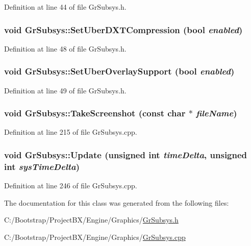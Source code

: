 Definition at line 44 of file GrSubsys.h.\hypertarget{class_gr_subsys_4def4c86d374f56b9d193fa851bcf8b5}{
\subsubsection[{SetUberDXTCompression}]{\setlength{\rightskip}{0pt plus 5cm}void GrSubsys::SetUberDXTCompression (bool {\em enabled})}}
\label{class_gr_subsys_4def4c86d374f56b9d193fa851bcf8b5}




Definition at line 48 of file GrSubsys.h.\hypertarget{class_gr_subsys_84c66e7b8a09731997e82f7f743cb625}{
\subsubsection[{SetUberOverlaySupport}]{\setlength{\rightskip}{0pt plus 5cm}void GrSubsys::SetUberOverlaySupport (bool {\em enabled})}}
\label{class_gr_subsys_84c66e7b8a09731997e82f7f743cb625}




Definition at line 49 of file GrSubsys.h.\hypertarget{class_gr_subsys_fef54c85657d029366011e1731c5f71e}{
\subsubsection[{TakeScreenshot}]{\setlength{\rightskip}{0pt plus 5cm}void GrSubsys::TakeScreenshot (const char $\ast$ {\em fileName})}}
\label{class_gr_subsys_fef54c85657d029366011e1731c5f71e}




Definition at line 215 of file GrSubsys.cpp.\hypertarget{class_gr_subsys_9881b11bf389779155d144a2a78d6dd2}{
\subsubsection[{Update}]{\setlength{\rightskip}{0pt plus 5cm}void GrSubsys::Update (unsigned int {\em timeDelta}, \/  unsigned int {\em sysTimeDelta})}}
\label{class_gr_subsys_9881b11bf389779155d144a2a78d6dd2}




Definition at line 246 of file GrSubsys.cpp.

The documentation for this class was generated from the following files:\begin{CompactItemize}
\item 
C:/Bootstrap/ProjectBX/Engine/Graphics/\hyperlink{_gr_subsys_8h}{GrSubsys.h}\item 
C:/Bootstrap/ProjectBX/Engine/Graphics/\hyperlink{_gr_subsys_8cpp}{GrSubsys.cpp}\end{CompactItemize}

